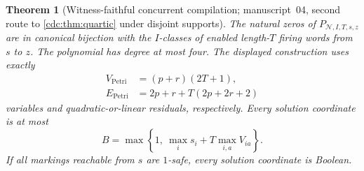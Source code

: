 \documentclass[11pt,a4paper]{article}
\newtheorem{theorem}{Theorem}[section]
\theoremstyle{definition}
\theoremstyle{remark}
\begin{document}
\begin{theorem}[Witness-faithful concurrent compilation; manuscript~04, second route to \cref{cdc:thm:quartic} under disjoint supports]\label{cdc:wf:thm:petri}
The natural zeros of $P_{\mathcal N,I,T,s,z}$ are in canonical bijection with the $I$-classes of enabled length-$T$ firing words from $s$ to $z$. The polynomial has degree at most four. The displayed construction uses exactly
\begin{align}
 V_{\mathrm{Petri}}&=(p+r)(2T+1),\label{cdc:wf:eq:petri-V}\\
 E_{\mathrm{Petri}}&=2p+r+T(2p+2r+2)\label{cdc:wf:eq:petri-E}
\end{align}
variables and quadratic-or-linear residuals, respectively. Every solution coordinate is at most
\begin{equation}\label{cdc:wf:eq:petri-height}
 B=\max\left\{1,\ \max_i s_i+T\max_{i,a}V_{ia}\right\}.
\end{equation}
If all markings reachable from $s$ are $1$-safe, every solution coordinate is Boolean.
\end{theorem}
\end{document}
